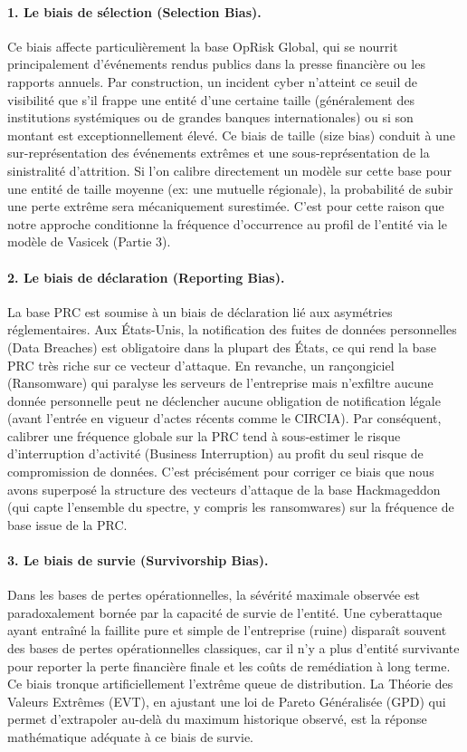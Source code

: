 \documentclass[11pt,a4paper]{article}
\theoremstyle{navystyle}
\theoremstyle{navydef}
\begin{document}
\paragraph{1. Le biais de sélection (Selection Bias).}
Ce biais affecte particulièrement la base OpRisk Global, qui se nourrit principalement d'événements rendus publics dans la presse financière ou les rapports annuels. Par construction, un incident cyber n'atteint ce seuil de visibilité que s'il frappe une entité d'une certaine taille (généralement des institutions systémiques ou de grandes banques internationales) ou si son montant est exceptionnellement élevé. 
Ce biais de taille (size bias) conduit à une sur-représentation des événements extrêmes et une sous-représentation de la sinistralité d'attrition. Si l'on calibre directement un modèle sur cette base pour une entité de taille moyenne (ex: une mutuelle régionale), la probabilité de subir une perte extrême sera mécaniquement surestimée. C'est pour cette raison que notre approche conditionne la fréquence d'occurrence au profil de l'entité via le modèle de Vasicek (Partie 3).

\paragraph{2. Le biais de déclaration (Reporting Bias).}
La base PRC est soumise à un biais de déclaration lié aux asymétries réglementaires. Aux États-Unis, la notification des fuites de données personnelles (Data Breaches) est obligatoire dans la plupart des États, ce qui rend la base PRC très riche sur ce vecteur d'attaque. En revanche, un rançongiciel (Ransomware) qui paralyse les serveurs de l'entreprise mais n'exfiltre aucune donnée personnelle peut ne déclencher aucune obligation de notification légale (avant l'entrée en vigueur d'actes récents comme le CIRCIA). 
Par conséquent, calibrer une fréquence globale sur la PRC tend à sous-estimer le risque d'interruption d'activité (Business Interruption) au profit du seul risque de compromission de données. C'est précisément pour corriger ce biais que nous avons superposé la structure des vecteurs d'attaque de la base Hackmageddon (qui capte l'ensemble du spectre, y compris les ransomwares) sur la fréquence de base issue de la PRC.

\paragraph{3. Le biais de survie (Survivorship Bias).}
Dans les bases de pertes opérationnelles, la sévérité maximale observée est paradoxalement bornée par la capacité de survie de l'entité. Une cyberattaque ayant entraîné la faillite pure et simple de l'entreprise (ruine) disparaît souvent des bases de pertes opérationnelles classiques, car il n'y a plus d'entité survivante pour reporter la perte financière finale et les coûts de remédiation à long terme. Ce biais tronque artificiellement l'extrême queue de distribution. La Théorie des Valeurs Extrêmes (EVT), en ajustant une loi de Pareto Généralisée (GPD) qui permet d'extrapoler au-delà du maximum historique observé, est la réponse mathématique adéquate à ce biais de survie.
\end{document}
